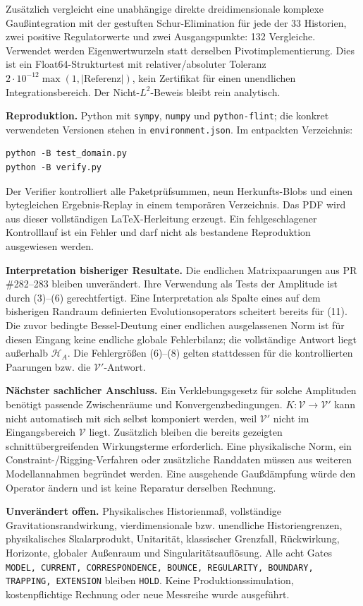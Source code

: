 \documentclass[10pt,a4paper]{article}
\newcommand{\HH}{\mathcal H_A}\newcommand{\VV}{\mathcal V}
\begin{document}
Zusätzlich vergleicht eine unabhängige direkte dreidimensionale komplexe
Gaußintegration mit der gestuften Schur-Elimination für jede der 33 Historien,
zwei positive Regulatorwerte und zwei Ausgangspunkte: 132 Vergleiche.
Verwendet werden Eigenwertwurzeln statt derselben Pivotimplementierung.
Dies ist ein Float64-Strukturtest mit relativer/absoluter Toleranz
$2\cdot10^{-12}\max(1,|\text{Referenz}|)$, kein Zertifikat für einen
unendlichen Integrationsbereich. Der Nicht-$L^2$-Beweis bleibt rein analytisch.

\textbf{Reproduktion.} Python mit \texttt{sympy}, \texttt{numpy} und
\texttt{python-flint}; die konkret verwendeten Versionen stehen in
\texttt{environment.json}. Im entpackten Verzeichnis:
\begin{verbatim}
python -B test_domain.py
python -B verify.py
\end{verbatim}
Der Verifier kontrolliert alle Paketprüfsummen, neun Herkunfts-Blobs und einen
bytegleichen Ergebnis-Replay in einem temporären Verzeichnis. Das PDF wird aus
dieser vollständigen \LaTeX-Herleitung erzeugt. Ein fehlgeschlagener Kontrolllauf
ist ein Fehler und darf nicht als bestandene Reproduktion ausgewiesen werden.

\textbf{Interpretation bisheriger Resultate.} Die endlichen Matrixpaarungen aus
PR \#282--283 bleiben unverändert. Ihre Verwendung als Tests der Amplitude ist
durch (3)--(6) gerechtfertigt. Eine Interpretation als Spalte eines auf dem
bisherigen Randraum definierten Evolutionsoperators scheitert bereits für (11).
Die zuvor bedingte Bessel-Deutung einer endlichen ausgelassenen Norm ist für
diesen Eingang keine endliche globale Fehlerbilanz; die vollständige Antwort
liegt außerhalb $\HH$. Die Fehlergrößen (6)--(8) gelten stattdessen für die
kontrollierten Paarungen bzw. die $\VV'$-Antwort.

\textbf{Nächster sachlicher Anschluss.} Ein Verklebungsgesetz für solche
Amplituden benötigt passende Zwischenräume und Konvergenzbedingungen.
$K:\VV\to\VV'$ kann nicht automatisch mit sich selbst komponiert werden,
weil $\VV'$ nicht im Eingangsbereich $\VV$ liegt. Zusätzlich bleiben die bereits
gezeigten schnittübergreifenden Wirkungsterme erforderlich. Eine physikalische
Norm, ein Constraint-/Rigging-Verfahren oder zusätzliche Randdaten müssen aus
weiteren Modellannahmen begründet werden. Eine ausgehende Gaußdämpfung würde
den Operator ändern und ist keine Reparatur derselben Rechnung.

\textbf{Unverändert offen.} Physikalisches Historienmaß, vollständige
Gravitationsrandwirkung, vierdimensionale bzw. unendliche Historiengrenzen,
physikalisches Skalarprodukt, Unitarität, klassischer Grenzfall, Rückwirkung,
Horizonte, globaler Außenraum und Singularitätsauflösung. Alle acht Gates
\texttt{MODEL, CURRENT, CORRESPONDENCE, BOUNCE, REGULARITY, BOUNDARY, TRAPPING,
EXTENSION} bleiben \texttt{HOLD}. Keine Produktionssimulation, kostenpflichtige
Rechnung oder neue Messreihe wurde ausgeführt.
\end{document}
